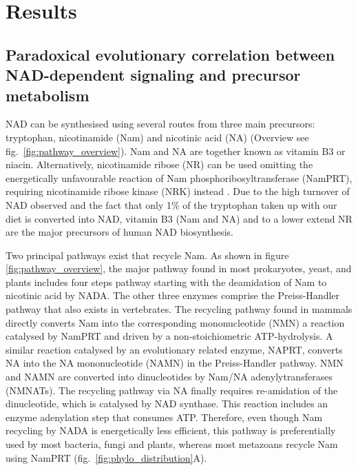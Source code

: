 
\section{Results}

\subsection{Paradoxical evolutionary correlation between NAD-dependent signaling and precursor metabolism}

NAD can be synthesised using several routes from three main precursors: tryptophan, nicotinamide (Nam) and nicotinic acid (NA) (Overview see fig.~\ref{fig:pathway_overview}). Nam and NA are together known as vitamin B3 or niacin. Alternatively, nicotinamide ribose (NR) can be used omitting the energetically unfavourable reaction of Nam phosphoribosyltransferase (NamPRT), requiring nicotinamide ribose kinase (NRK) instead \cite{Yoshino2018}. Due to the high turnover of NAD observed and the fact that only 1\% of the tryptophan taken up with our diet is converted into NAD, vitamin B3 (Nam and NA) and to a lower extend NR are the major precursors of human NAD biosynthesis.

Two principal pathways exist that recycle Nam. As shown in figure \ref{fig:pathway_overview}, the major pathway found in most prokaryotes, yeast, and plants includes four steps pathway starting with the deamidation of Nam to nicotinic acid by NADA. The other three enzymes comprise the Preiss-Handler pathway that also exists in vertebrates. The recycling pathway found in mammals directly converts Nam into the corresponding mononucleotide (NMN) a reaction catalysed by NamPRT and driven by a non-stoichiometric ATP-hydrolysis. A similar reaction catalysed by an evolutionary related enzyme, NAPRT, converts NA into the NA mononucleotide (NAMN) in the Preiss-Handler pathway. NMN and NAMN are converted into dinucleotides by Nam/NA adenylytransferases (NMNATs). The recycling pathway via NA finally requires re-amidation of the dinucleotide, which is catalysed by NAD synthase. This reaction includes an enzyme adenylation step that consumes ATP. Therefore, even though Nam recycling by NADA is energetically less efficient, this pathway is preferentially used by most bacteria, fungi and plants, whereas most metazoans recycle Nam using NamPRT (fig.~\ref{fig:phylo_distribution}A).

